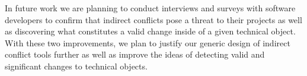 \documentclass[conference]{IEEEtran}
\begin{document}
In future work we are planning to conduct interviews and surveys
with software developers to confirm that indirect conflicts pose a
threat to their projects as well as discovering what constitutes a 
valid change inside of a given technical object. With these two
improvements, we plan to justify our generic design of indirect
conflict tools further as well as improve the ideas of detecting 
valid and significant changes to technical objects.




\end{document}
